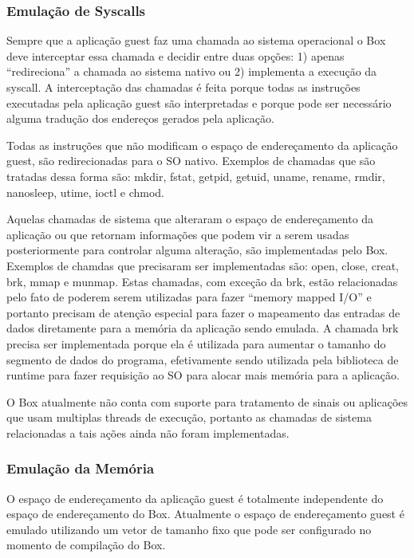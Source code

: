 \documentclass[11pt,twoside]{article}
\begin{document}
\subsubsection{Emulação de Syscalls}

Sempre que a aplicação guest faz uma chamada ao sistema operacional o
Box deve interceptar essa chamada e decidir entre duas opções: 1) 
apenas ``redireciona'' a chamada ao sistema nativo ou 2) implementa a 
execução da syscall. A interceptação das chamadas é feita porque todas
as instruções executadas pela aplicação guest são interpretadas e porque
pode ser necessário alguma tradução dos endereços gerados pela aplicação.

Todas as instruções que não modificam o espaço de endereçamento da 
aplicação guest, são redirecionadas para o SO nativo. Exemplos de 
chamadas que são tratadas dessa forma são: mkdir, fstat, getpid, getuid, 
uname, rename, rmdir, nanosleep, utime, ioctl e chmod.

Aquelas chamadas de sistema que alteraram o espaço de endereçamento da 
aplicação ou que retornam informações que podem vir a serem usadas 
posteriormente para controlar alguma alteração, são implementadas pelo Box. 
Exemplos de chamdas que precisaram ser implementadas são: open, close, creat,
brk, mmap e munmap. Estas chamadas, com exceção da brk, estão relacionadas 
pelo fato de poderem serem utilizadas para fazer ``memory mapped I/O'' e 
portanto precisam de atenção especial para fazer o mapeamento das entradas
de dados diretamente para a memória da aplicação sendo emulada. A chamada
brk precisa ser implementada porque ela é utilizada para aumentar o tamanho
do segmento de dados do programa, efetivamente sendo utilizada pela biblioteca
de runtime para fazer requisição ao SO para alocar mais memória para a
aplicação.

O Box atualmente não conta com suporte para tratamento de sinais ou 
aplicações que usam multiplas threads de execução, portanto as chamadas
de sistema relacionadas a tais ações ainda não foram implementadas.

\subsubsection{Emulação da Memória}

O espaço de endereçamento da aplicação guest é totalmente independente
do espaço de endereçamento do Box. Atualmente o espaço de endereçamento
guest é emulado utilizando um vetor de tamanho fixo que pode ser configurado
no momento de compilação do Box.
\end{document}
